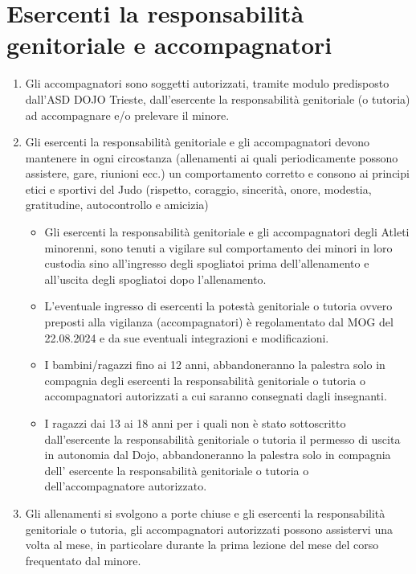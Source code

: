\documentclass{djtsdoc}
\begin{document}
	\section{Esercenti la responsabilità genitoriale e accompagnatori}
	\begin{enumerate}
		\item Gli accompagnatori sono soggetti autorizzati, tramite modulo predisposto dall'ASD DOJO Trieste, dall'esercente la responsabilità genitoriale (o tutoria) ad accompagnare e/o prelevare il minore.
		\item Gli esercenti la responsabilità genitoriale e gli accompagnatori devono mantenere in ogni circostanza (allenamenti ai quali periodicamente possono assistere, gare, riunioni ecc.) un comportamento corretto e consono ai principi etici e sportivi del Judo (rispetto, coraggio, sincerità, onore, modestia, gratitudine, autocontrollo e amicizia)
		\begin{itemize}
			\item Gli esercenti la responsabilità genitoriale e gli accompagnatori degli Atleti minorenni, sono tenuti a vigilare sul comportamento dei minori in loro custodia sino all'ingresso degli spogliatoi prima dell'allenamento e all'uscita degli spogliatoi dopo l'allenamento.
			\item L'eventuale ingresso di esercenti la potestà genitoriale o tutoria ovvero preposti alla vigilanza (accompagnatori) è regolamentato dal MOG del 22.08.2024 e da sue eventuali integrazioni e modificazioni.
			\item I bambini/ragazzi fino ai 12 anni, abbandoneranno la palestra solo in compagnia degli esercenti la responsabilità genitoriale o tutoria o accompagnatori autorizzati a cui saranno consegnati dagli insegnanti.
			\item I ragazzi dai 13 ai 18 anni per i quali non è stato sottoscritto dall'esercente la responsabilità genitoriale  o tutoria il permesso di uscita in autonomia dal Dojo, abbandoneranno la palestra solo in compagnia dell' esercente la responsabilità genitoriale o tutoria o dell'accompagnatore autorizzato.
		\end{itemize}
		\item Gli allenamenti si svolgono a porte chiuse e gli esercenti la responsabilità genitoriale o tutoria, gli accompagnatori autorizzati possono assistervi una volta al mese, in particolare durante la prima lezione del mese del corso frequentato dal minore.
	\end{enumerate}
	
\end{document}
